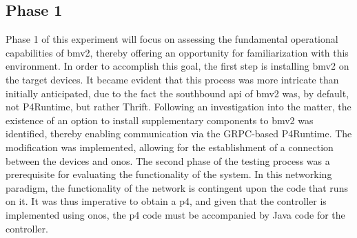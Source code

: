 \subsection{Phase 1}
Phase 1 of this experiment will focus on assessing the fundamental operational capabilities of \gls{bmv2}, thereby offering an opportunity for familiarization with this environment. In order to accomplish this goal, the first step is installing \gls{bmv2} on the target devices. It became evident that this process was more intricate than initially anticipated, due to the fact the southbound \gls{api} of \gls{bmv2} was, by default, not P4Runtime, but rather Thrift. Following an investigation into the matter, the existence of an option to install supplementary components to \gls{bmv2} was identified, thereby enabling communication via the GRPC-based P4Runtime. The modification was implemented, allowing for the establishment of a connection between the devices and \gls{onos}.
The second phase of the testing process was a prerequisite for evaluating the functionality of the system. In this networking paradigm, the functionality of the network is contingent upon the code that runs on it. It was thus imperative to obtain a \gls{p4}, and given that the controller is implemented using \gls{onos}, the \gls{p4} code must be accompanied by Java code for the controller. 

